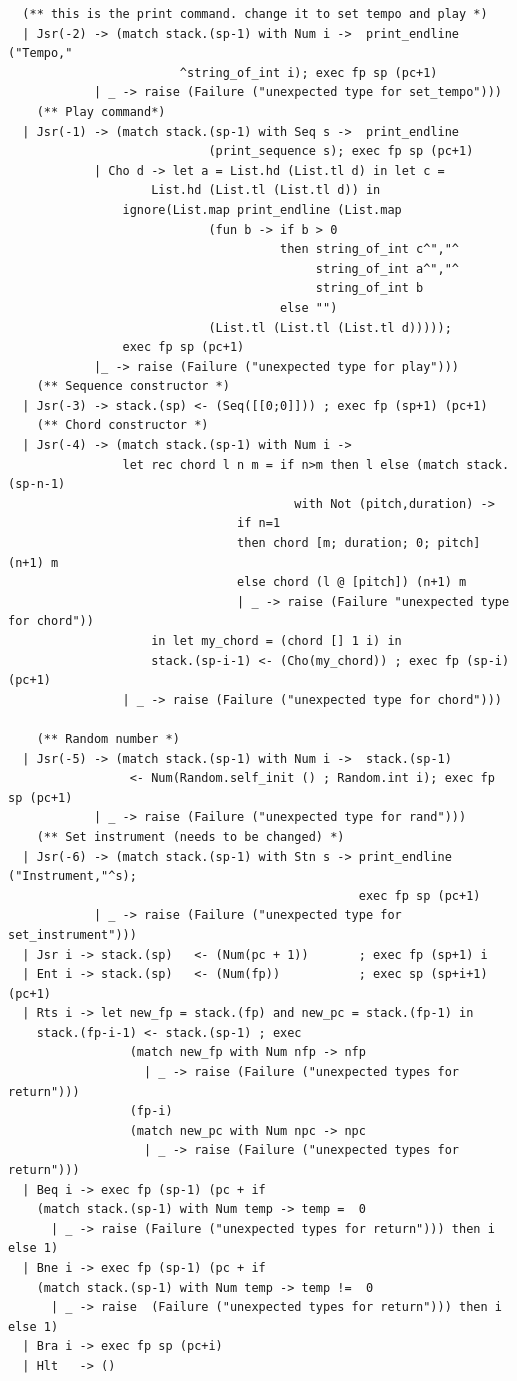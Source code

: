 \documentclass[12pt,A4]{book}
\begin{document}
\begin{verbatim}
  (** this is the print command. change it to set tempo and play *)
  | Jsr(-2) -> (match stack.(sp-1) with Num i ->  print_endline ("Tempo,"
                        ^string_of_int i); exec fp sp (pc+1)
            | _ -> raise (Failure ("unexpected type for set_tempo")))
    (** Play command*)
  | Jsr(-1) -> (match stack.(sp-1) with Seq s ->  print_endline
                            (print_sequence s); exec fp sp (pc+1)
            | Cho d -> let a = List.hd (List.tl d) in let c = 
                    List.hd (List.tl (List.tl d)) in
                ignore(List.map print_endline (List.map 
                            (fun b -> if b > 0 
                                      then string_of_int c^","^
                                           string_of_int a^","^
                                           string_of_int b 
                                      else "") 
                            (List.tl (List.tl (List.tl d)))));
                exec fp sp (pc+1)
            |_ -> raise (Failure ("unexpected type for play")))
    (** Sequence constructor *)
  | Jsr(-3) -> stack.(sp) <- (Seq([[0;0]])) ; exec fp (sp+1) (pc+1)
    (** Chord constructor *)
  | Jsr(-4) -> (match stack.(sp-1) with Num i ->
                let rec chord l n m = if n>m then l else (match stack.(sp-n-1) 
                                        with Not (pitch,duration) ->
                                if n=1 
                                then chord [m; duration; 0; pitch] (n+1) m 
                                else chord (l @ [pitch]) (n+1) m
                                | _ -> raise (Failure "unexpected type for chord"))
                    in let my_chord = (chord [] 1 i) in
                    stack.(sp-i-1) <- (Cho(my_chord)) ; exec fp (sp-i) (pc+1)
                | _ -> raise (Failure ("unexpected type for chord")))

    (** Random number *)
  | Jsr(-5) -> (match stack.(sp-1) with Num i ->  stack.(sp-1) 
                 <- Num(Random.self_init () ; Random.int i); exec fp sp (pc+1)
            | _ -> raise (Failure ("unexpected type for rand")))
    (** Set instrument (needs to be changed) *)
  | Jsr(-6) -> (match stack.(sp-1) with Stn s -> print_endline ("Instrument,"^s); 
                                                 exec fp sp (pc+1)
			| _ -> raise (Failure ("unexpected type for set_instrument")))
  | Jsr i -> stack.(sp)   <- (Num(pc + 1))       ; exec fp (sp+1) i
  | Ent i -> stack.(sp)   <- (Num(fp))           ; exec sp (sp+i+1) (pc+1)
  | Rts i -> let new_fp = stack.(fp) and new_pc = stack.(fp-1) in
    stack.(fp-i-1) <- stack.(sp-1) ; exec 
                 (match new_fp with Num nfp -> nfp  
                   | _ -> raise (Failure ("unexpected types for return"))) 
                 (fp-i) 
                 (match new_pc with Num npc -> npc  
                   | _ -> raise (Failure ("unexpected types for return")))
  | Beq i -> exec fp (sp-1) (pc + if 
    (match stack.(sp-1) with Num temp -> temp =  0 
      | _ -> raise (Failure ("unexpected types for return"))) then i else 1)
  | Bne i -> exec fp (sp-1) (pc + if 
    (match stack.(sp-1) with Num temp -> temp !=  0 
      | _ -> raise  (Failure ("unexpected types for return"))) then i else 1)
  | Bra i -> exec fp sp (pc+i)
  | Hlt   -> ()


\end{verbatim}
\end{document}
